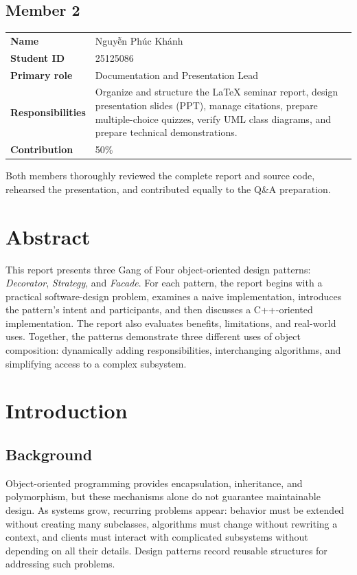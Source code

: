 \documentclass[11pt,a4paper]{report}
\begin{document}
\section*{Member 2}
\begin{tabularx}{\textwidth}{@{}lY@{}}
\toprule
\textbf{Name} & \foreignlanguage{vietnamese}{Nguyễn Phúc Khánh} \\
\textbf{Student ID} & 25125086 \\
\textbf{Primary role} & Documentation and Presentation Lead \\
\textbf{Responsibilities} & Organize and structure the LaTeX seminar report, design presentation slides (PPT), manage citations, prepare multiple-choice quizzes, verify UML class diagrams, and prepare technical demonstrations. \\
\textbf{Contribution} & 50\% \\
\bottomrule
\end{tabularx}

Both members thoroughly reviewed the complete report and source code, rehearsed the presentation, and contributed equally to the Q\&A preparation.

\clearpage
\chapter*{Abstract}
This report presents three Gang of Four object-oriented design patterns:
\emph{Decorator}, \emph{Strategy}, and \emph{Facade}. For each pattern, the
report begins with a practical software-design problem, examines a naive
implementation, introduces the pattern's intent and participants, and then
discusses a C++-oriented implementation. The report also evaluates benefits,
limitations, and real-world uses. Together, the patterns demonstrate three
different uses of object composition: dynamically adding responsibilities,
interchanging algorithms, and simplifying access to a complex subsystem.

\tableofcontents
\clearpage
{}

\chapter{Introduction}

\section{Background}
Object-oriented programming provides encapsulation, inheritance, and
polymorphism, but these mechanisms alone do not guarantee maintainable design.
As systems grow, recurring problems appear: behavior must be extended without
creating many subclasses, algorithms must change without rewriting a context,
and clients must interact with complicated subsystems without depending on all
their details. Design patterns record reusable structures for addressing such
problems.
\end{document}
